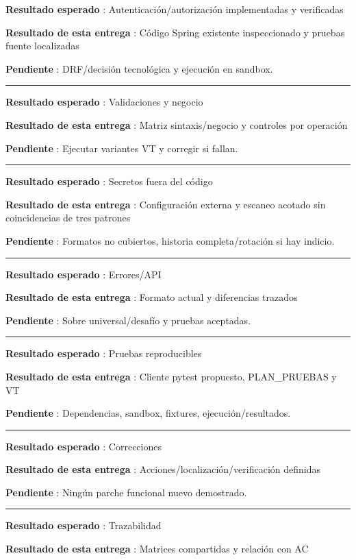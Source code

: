 \documentclass[11pt,a4paper]{article}
\begin{document}
\textbf{Resultado esperado }: Autenticación/autorización implementadas y
verificadas

\textbf{Resultado de esta entrega }: Código Spring existente
inspeccionado y pruebas fuente localizadas

\textbf{Pendiente }: DRF/decisión tecnológica y ejecución en sandbox.

\medskip\hrule\medskip

\textbf{Resultado esperado }: Validaciones y negocio

\textbf{Resultado de esta entrega }: Matriz sintaxis/negocio y controles
por operación

\textbf{Pendiente }: Ejecutar variantes VT y corregir si fallan.

\medskip\hrule\medskip

\textbf{Resultado esperado }: Secretos fuera del código

\textbf{Resultado de esta entrega }: Configuración externa y escaneo
acotado sin coincidencias de tres patrones

\textbf{Pendiente }: Formatos no cubiertos, historia completa/rotación
si hay indicio.

\medskip\hrule\medskip

\textbf{Resultado esperado }: Errores/API

\textbf{Resultado de esta entrega }: Formato actual y diferencias
trazados

\textbf{Pendiente }: Sobre universal/desafío y pruebas aceptadas.

\medskip\hrule\medskip

\textbf{Resultado esperado }: Pruebas reproducibles

\textbf{Resultado de esta entrega }: Cliente pytest propuesto,
PLAN\_PRUEBAS y VT

\textbf{Pendiente }: Dependencias, sandbox, fixtures,
ejecución/resultados.

\medskip\hrule\medskip

\textbf{Resultado esperado }: Correcciones

\textbf{Resultado de esta entrega }: Acciones/localización/verificación
definidas

\textbf{Pendiente }: Ningún parche funcional nuevo demostrado.

\medskip\hrule\medskip

\textbf{Resultado esperado }: Trazabilidad

\textbf{Resultado de esta entrega }: Matrices compartidas y relación con
AC
\end{document}
